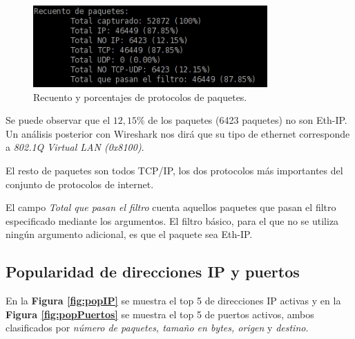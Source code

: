 \documentclass[a4paper, 11pt]{article}	%
\begin{document}
\begin{figure}[H]
\centering
\includegraphics[width=0.8\textwidth]{recuento.png}
\caption{Recuento y porcentajes de protocolos de paquetes.}
\label{fig:recuento}
\end{figure}

Se puede observar que el $12,15\%$ de los paquetes (6423 paquetes) no son Eth-IP. Un análisis posterior con Wireshark nos dirá que su tipo de ethernet corresponde a \textit{802.1Q Virtual LAN (0x8100)}.

El resto de paquetes son todos TCP/IP, los dos protocolos más importantes del conjunto de protocolos de internet.

El campo \textit{Total que pasan el filtro} cuenta aquellos paquetes que pasan el filtro especificado mediante los argumentos. El filtro básico, para el que no se utiliza ningún argumento adicional, es que el paquete sea Eth-IP.

\subsection{Popularidad de direcciones IP y puertos}
En la \textbf{Figura \ref{fig:popIP}} se muestra el top 5 de direcciones IP activas y en la \textbf{Figura \ref{fig:popPuertos}} se muestra el top 5 de puertos activos, ambos clasificados por \textit{número de paquetes, tamaño en bytes, origen} y \textit{destino}.
\end{document}
